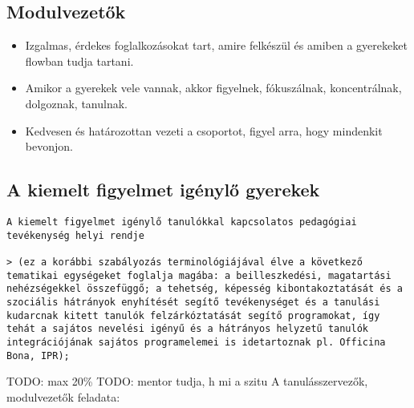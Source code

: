 \subsection{Modulvezetők}\label{modulvezetux151k}

\begin{itemize}

\item
  Izgalmas, érdekes foglalkozásokat tart, amire felkészül és amiben a
  gyerekeket flowban tudja tartani.
\item
  Amikor a gyerekek vele vannak, akkor figyelnek, fókuszálnak,
  koncentrálnak, dolgoznak, tanulnak.
\item
  Kedvesen és határozottan vezeti a csoportot, figyel arra, hogy
  mindenkit bevonjon.
\end{itemize}

\subsection{A kiemelt figyelmet igénylő
gyerekek}\label{a-kiemelt-figyelmet-iguxe9nylux151-gyerekek}

\begin{verbatim}
A kiemelt figyelmet igénylő tanulókkal kapcsolatos pedagógiai tevékenység helyi rendje

> (ez a korábbi szabályozás terminológiájával élve a következő tematikai egységeket foglalja magába: a beilleszkedési, magatartási nehézségekkel összefüggő; a tehetség, képesség kibontakoztatását és a szociális hátrányok enyhítését segítő tevékenységet és a tanulási kudarcnak kitett tanulók felzárkóztatását segítő programokat, így tehát a sajátos nevelési igényű és a hátrányos helyzetű tanulók integrációjának sajátos programelemei is idetartoznak pl. Officina Bona, IPR);
\end{verbatim}

TODO: max 20\% TODO: mentor tudja, h mi a szitu
A tanulásszervezők, modulvezetők feladata:

